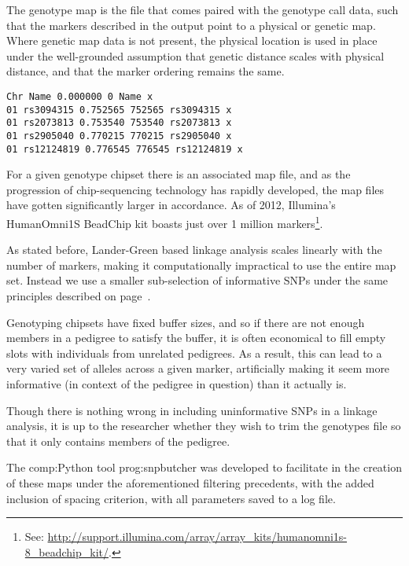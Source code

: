 The genotype map is the file that comes paired with the genotype call data, such that the markers described in the output point to a physical or genetic map. Where genetic map data is not present, the physical location is used in place under the well-grounded assumption that genetic distance scales with physical distance, and that the marker ordering remains the same.

\begingroup
\vspace{10pt}
\begin{lstlisting}
Chr Name 0.000000 0 Name x
01 rs3094315 0.752565 752565 rs3094315 x
01 rs2073813 0.753540 753540 rs2073813 x
01 rs2905040 0.770215 770215 rs2905040 x
01 rs12124819 0.776545 776545 rs12124819 x
\end{lstlisting}
\vspace{-10pt}
\endgroup

For a given genotype chipset there is an associated map file, and as the progression of chip-sequencing technology has rapidly developed, the map files have gotten significantly larger in accordance. As of 2012, Illumina's HumanOmni1S BeadChip kit boasts just over 1 million markers\footnote{See: \url{http://support.illumina.com/array/array_kits/humanomni1s-8_beadchip_kit/}.}.

As stated before, Lander-Green based linkage analysis scales linearly with the number of markers, making it computationally impractical to use the entire map set. Instead we use a smaller sub-selection of informative SNPs under the same principles described on page~\pageref{informativemarkers}.

Genotyping chipsets have fixed buffer sizes, and so if there are not enough members in a pedigree to satisfy the buffer, it is often economical to fill empty slots with individuals from unrelated pedigrees. As a result, this can lead to a very varied set of alleles across a given marker, artificially making it seem more informative (in context of the pedigree in question) than it actually is.

Though there is nothing wrong in including uninformative SNPs in a linkage analysis, it is up to the researcher whether they wish to trim the genotypes file so that it only contains members of the pedigree.

The \gls{comp:Python} tool \gls{prog:snpbutcher} was developed to facilitate in the creation of these maps under the aforementioned filtering precedents, with the added inclusion of spacing criterion, with all parameters saved to a log file.

